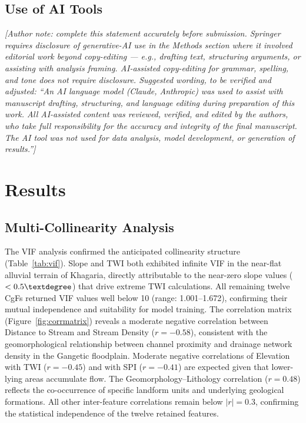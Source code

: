 \documentclass[12pt, a4paper]{article}
\begin{document}
\subsection*{Use of AI Tools}
\textit{[Author note: complete this statement accurately before submission. Springer requires disclosure of generative-AI use in the Methods section where it involved editorial work beyond copy-editing --- e.g., drafting text, structuring arguments, or assisting with analysis framing. AI-assisted copy-editing for grammar, spelling, and tone does not require disclosure. Suggested wording, to be verified and adjusted: ``An AI language model (Claude, Anthropic) was used to assist with manuscript drafting, structuring, and language editing during preparation of this work. All AI-assisted content was reviewed, verified, and edited by the authors, who take full responsibility for the accuracy and integrity of the final manuscript. The AI tool was not used for data analysis, model development, or generation of results.'']}

\section{Results}

\subsection{Multi-Collinearity Analysis}

The VIF analysis confirmed the anticipated collinearity structure (Table~\ref{tab:vif}). Slope and TWI both exhibited infinite VIF in the near-flat alluvial terrain of Khagaria, directly attributable to the near-zero slope values ($< 0.5\textdegree$) that drive extreme TWI calculations. All remaining twelve CgFs returned VIF values well below 10 (range: 1.001--1.672), confirming their mutual independence and suitability for model training. The correlation matrix (Figure~\ref{fig:corrmatrix}) reveals a moderate negative correlation between Distance to Stream and Stream Density ($r = -0.58$), consistent with the geomorphological relationship between channel proximity and drainage network density in the Gangetic floodplain. Moderate negative correlations of Elevation with TWI ($r = -0.45$) and with SPI ($r = -0.41$) are expected given that lower-lying areas accumulate flow. The Geomorphology--Lithology correlation ($r = 0.48$) reflects the co-occurrence of specific landform units and underlying geological formations. All other inter-feature correlations remain below $|r| = 0.3$, confirming the statistical independence of the twelve retained features.
\end{document}
